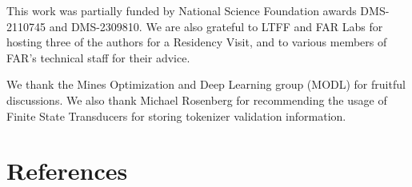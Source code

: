 \documentclass[10pt,a4paper,onecolumn]{article}
\begin{document}
This work was partially funded by National Science Foundation awards
DMS-2110745 and DMS-2309810. We are also grateful to LTFF and FAR Labs
for hosting three of the authors for a Residency Visit, and to various
members of FAR's technical staff for their advice.

We thank the Mines Optimization and Deep Learning group (MODL) for
fruitful discussions. We also thank Michael Rosenberg for recommending
the usage of Finite State Transducers for storing tokenizer validation
information.

\hypertarget{references}{%
\section*{References}\label{references}}
\end{document}
